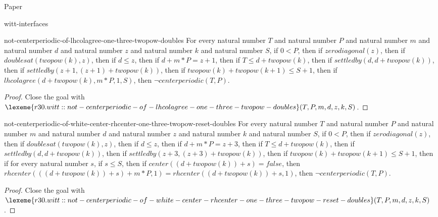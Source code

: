 \begin{lexlean}{Paper}
\begin{section}{witt-interfaces}
  \begin{theorem}{not-centerperiodic-of-lhcolagree-one-three-twopow-doubles}
  For every natural number \(T\) and natural number \(P\) and natural number \(m\) and natural number \(d\) and natural number \(z\) and natural number \(k\) and natural number \(S\), if \(0 < P\), then if \(zerodiagonal(z)\), then if \(doublesat(twopow(k), z)\), then if \(d ≤ z\), then if \(d + m * P = z + 1\), then if \(T ≤ d + twopow(k)\), then if \(settledby(d, d + twopow(k))\), then if \(settledby(z + 1, (z + 1) + twopow(k))\), then if \(twopow(k) + twopow(k + 1) ≤ S + 1\), then if \(lhcolagree(d + twopow(k), m * P, 1, S)\), then \(¬ centerperiodic(T, P)\).
  \begin{proof}
  Close the goal with \(\lexeme{r30.witt::not-centerperiodic-of-lhcolagree-one-three-twopow-doubles}(T, P, m, d, z, k, S)\).
  \end{proof}
  \end{theorem}

  \begin{theorem}{not-centerperiodic-of-white-center-rhcenter-one-three-twopow-reset-doubles}
  For every natural number \(T\) and natural number \(P\) and natural number \(m\) and natural number \(d\) and natural number \(z\) and natural number \(k\) and natural number \(S\), if \(0 < P\), then if \(zerodiagonal(z)\), then if \(doublesat(twopow(k), z)\), then if \(d ≤ z\), then if \(d + m * P = z + 3\), then if \(T ≤ d + twopow(k)\), then if \(settledby(d, d + twopow(k))\), then if \(settledby(z + 3, (z + 3) + twopow(k))\), then if \(twopow(k) + twopow(k + 1) ≤ S + 1\), then if for every natural number \(s\), if \(s ≤ S\), then if \(center((d + twopow(k)) + s) = false\), then \(rhcenter(((d + twopow(k)) + s) + m * P, 1) = rhcenter((d + twopow(k)) + s, 1)\), then \(¬ centerperiodic(T, P)\).
  \begin{proof}
  Close the goal with \(\lexeme{r30.witt::not-centerperiodic-of-white-center-rhcenter-one-three-twopow-reset-doubles}(T, P, m, d, z, k, S)\).
  \end{proof}
  \end{theorem}


\end{section}
\end{lexlean}
